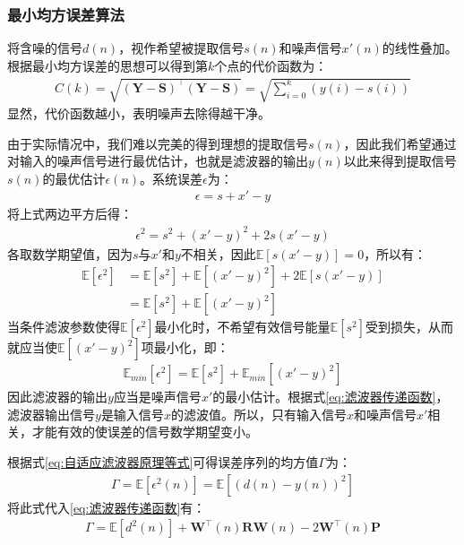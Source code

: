 \documentclass{ctexart}
\begin{document}
			\subsubsection{最小均方误差算法}
				将含噪的信号$d(n)$，视作希望被提取信号$s(n)$和噪声信号$x'(n)$的线性叠加。根据最小均方误差的思想可以得到第$k$个点的代价函数为：
				\begin{gather}
					C(k)=\sqrt{(\bm{Y}-\bm{S})^\top(\bm{Y}-\bm{S})}=\sqrt{\sum_{i=0}^{k}(y(i)-s(i))}
				\end{gather}
				显然，代价函数越小，表明噪声去除得越干净。\par
				由于实际情况中，我们难以完美的得到理想的提取信号$s(n)$，因此我们希望通过对输入的噪声信号进行最优估计，也就是滤波器的输出$y(n)$以此来得到提取信号$s(n)$的最优估计$\epsilon(n)$。系统误差$\epsilon$为：
				\begin{gather}
					\epsilon=s+x'-y
					\label{eq:噪声信号的等式}
				\end{gather}
				将上式两边平方后得：
				\begin{gather}
					\epsilon^2=s^2+(x'-y)^2+2s(x'-y)
				\end{gather}
				各取数学期望值，因为$s$与$x'$和$y$不相关，因此$\mathbb{E}[s(x'-y)]=0$，所以有：
				\begin{align}
					\mathbb{E}[\epsilon^2]&=\mathbb{E}[s^2]+\mathbb{E}[(x'-y)^2]+2\mathbb{E}[s(x'-y)]\\
					&=\mathbb{E}[s^2]+\mathbb{E}[(x'-y)^2]
				\end{align}
				当条件滤波参数使得$\mathbb{E}[\epsilon^2]$最小化时，不希望有效信号能量$\mathbb{E}[s^2]$受到损失，从而就应当使$\mathbb{E}[(x'-y)^2]$项最小化，即：
				\begin{gather}
					\mathbb{E}_{min}[\epsilon^2]=\mathbb{E}[s^2]+\mathbb{E}_{min}[(x'-y)^2]
				\end{gather}
				因此滤波器的输出$y$应当是噪声信号$x'$的最小估计。根据式\ref{eq:滤波器传递函数}，滤波器输出信号$y$是输入信号$x$的滤波值。所以，只有输入信号$x$和噪声信号$x'$相关，才能有效的使误差的信号数学期望变小。\par
				根据式\ref{eq:自适应滤波器原理等式}可得误差序列的均方值$\Gamma$为：
				\begin{gather}
					\Gamma=\mathbb{E}[\epsilon^2(n)]=\mathbb{E}[(d(n)-y(n))^2]
				\end{gather}
				将此式代入\ref{eq:滤波器传递函数}有：
				\begin{gather}
					\Gamma=\mathbb{E}[d^2(n)]+\bm{W}^\top(n)\bm{R}\bm{W}(n)-2\bm{W}^\top(n)\bm{P}
				\end{gather}
\end{document}
